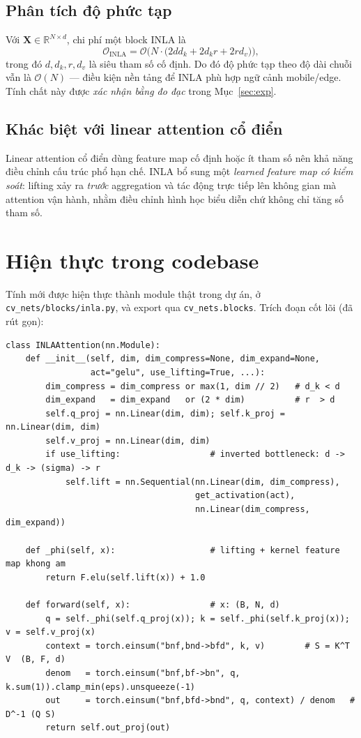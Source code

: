 \documentclass[12pt,a4paper]{article}
\begin{document}
\subsection{Phân tích độ phức tạp}
Với $\mathbf{X} \in \mathbb{R}^{N \times d}$, chi phí một block INLA là
\begin{equation}
\mathcal{O}_{\mathrm{INLA}} = \mathcal{O}\!\Big(N\cdot\big(2dd_k + 2d_kr + 2rd_v\big)\Big),
\end{equation}
trong đó $d, d_k, r, d_v$ là siêu tham số cố định. Do đó độ phức tạp theo độ dài chuỗi vẫn là
$\mathcal{O}(N)$ --- điều kiện nền tảng để INLA phù hợp ngữ cảnh mobile/edge. Tính chất này được
\emph{xác nhận bằng đo đạc} trong Mục~\ref{sec:exp}.

\subsection{Khác biệt với linear attention cổ điển}
Linear attention cổ điển dùng feature map cố định hoặc ít tham số nên khả năng điều chỉnh cấu trúc
phổ hạn chế. INLA bổ sung một \emph{learned feature map có kiểm soát}: lifting xảy ra \emph{trước}
aggregation và tác động trực tiếp lên không gian mà attention vận hành, nhằm điều chỉnh hình học
biểu diễn chứ không chỉ tăng số tham số.

\section{Hiện thực trong codebase}
\label{sec:impl}

Tính mới được hiện thực thành module thật trong dự án, ở \texttt{cv\_nets/blocks/inla.py}, và export
qua \texttt{cv\_nets.blocks}. Trích đoạn cốt lõi (đã rút gọn):

\begin{lstlisting}
class INLAAttention(nn.Module):
    def __init__(self, dim, dim_compress=None, dim_expand=None,
                 act="gelu", use_lifting=True, ...):
        dim_compress = dim_compress or max(1, dim // 2)   # d_k < d
        dim_expand   = dim_expand   or (2 * dim)          # r  > d
        self.q_proj = nn.Linear(dim, dim); self.k_proj = nn.Linear(dim, dim)
        self.v_proj = nn.Linear(dim, dim)
        if use_lifting:                  # inverted bottleneck: d -> d_k -> (sigma) -> r
            self.lift = nn.Sequential(nn.Linear(dim, dim_compress),
                                      get_activation(act),
                                      nn.Linear(dim_compress, dim_expand))

    def _phi(self, x):                   # lifting + kernel feature map khong am
        return F.elu(self.lift(x)) + 1.0

    def forward(self, x):                # x: (B, N, d)
        q = self._phi(self.q_proj(x)); k = self._phi(self.k_proj(x)); v = self.v_proj(x)
        context = torch.einsum("bnf,bnd->bfd", k, v)        # S = K^T V  (B, F, d)
        denom   = torch.einsum("bnf,bf->bn", q, k.sum(1)).clamp_min(eps).unsqueeze(-1)
        out     = torch.einsum("bnf,bfd->bnd", q, context) / denom   # D^-1 (Q S)
        return self.out_proj(out)
\end{lstlisting}
\end{document}
